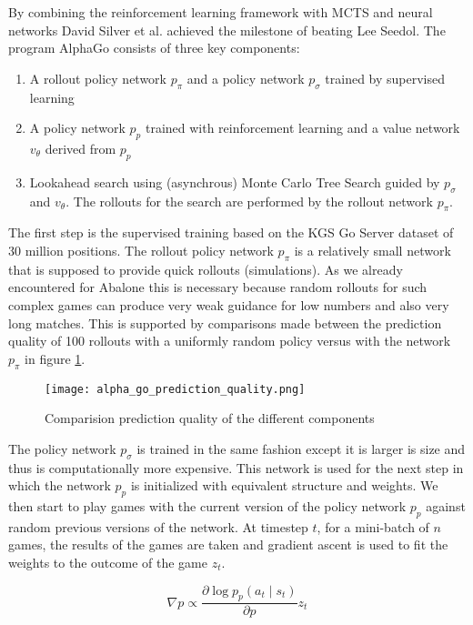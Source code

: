 By combining the reinforcement learning framework with MCTS and neural networks David Silver et al. achieved the milestone of beating Lee Seedol. The program AlphaGo consists of three key components:

\begin{enumerate}
    \item A rollout policy network $p_{\pi}$ and a policy network $p_{\sigma}$ trained by supervised learning
    \item A policy network $p_p$ trained with reinforcement learning and a value network $v_{\theta}$ derived from $p_p$
    \item Lookahead search using (asynchrous) Monte Carlo Tree Search guided by $p_{\sigma}$ and $v_{\theta}$. The rollouts for the search are performed by the rollout network $p_{\pi}$.
\end{enumerate}

The first step is the supervised training based on the KGS Go Server dataset of 30 million positions. The rollout policy network $p_{\pi}$ is a relatively small network that is supposed to provide quick rollouts (simulations). As we already encountered for Abalone this is necessary because random rollouts for such complex games can produce very weak guidance for low numbers and also very long matches. This is supported by comparisons made between the prediction quality of 100 rollouts with a uniformly random policy versus with the network $p_{\pi}$ in figure \ref{alpha_go_prediction_quality}.

\begin{figure}
    \centering
    \texttt{[image: alpha\_go\_prediction\_quality.png]}
    \caption{Comparision prediction quality of the different components \cite{silver_mastering_2016}}
    \label{alpha_go_prediction_quality}
\end{figure}

The policy network $p_{\sigma}$ is trained in the same fashion except it is larger is size and thus is computationally more expensive. This network is used for the next step in which the network $p_{p}$ is initialized with equivalent structure and weights. We then start to play games with the current version of the policy network $p_{p}$ against random previous versions of the network. At timestep $t$, for a mini-batch of $n$ games, the results of the games are taken and gradient ascent is used to fit the weights to the outcome of the game $z_t$.

$$
    \nabla p \propto \frac{\partial \log p_p(a_t \mid s_t)}{\partial p}z_t
$$

